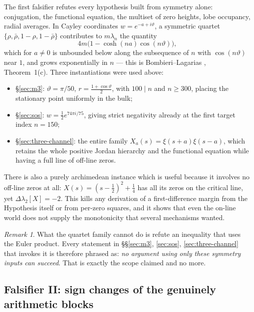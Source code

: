\documentclass[11pt]{amsart}
\theoremstyle{definition}
\theoremstyle{remark}
\newtheorem{remark}[theorem]{Remark}
\theoremstyle{definition}
\newcommand{\half}{\tfrac{1}{2}}
\begin{document}
The first falsifier refutes every hypothesis built from symmetry alone: conjugation, the functional
equation, the multiset of zero heights, lobe occupancy, radial averages. In Cayley coordinates
$w=e^{-a+i\vartheta}$, a symmetric quartet $\{\rho,\bar\rho,1-\rho,1-\bar\rho\}$ contributes to
$m\lambda_n$ the quantity
\begin{equation}\label{eq:quartet-general}
   4m\bigl(1-\cosh(na)\cos(n\vartheta)\bigr),
\end{equation}
which for $a\ne0$ is unbounded below along the subsequence of $n$ with $\cos(n\vartheta)$ near
$1$, and grows exponentially in $n$ --- this is Bombieri--Lagarias
\cite{BombieriLagarias1999}, Theorem~1(c). Three instantiations were used above:
\begin{itemize}[leftmargin=*]
\item \S\ref{sec:m3}: $\vartheta=\pi/50$, $r=\tfrac{1+\cos\vartheta}{2}$, with $100\mid n$ and
      $n\ge300$, placing the stationary point uniformly in the bulk;
\item \S\ref{sec:sos}: $w=\tfrac12e^{74\pi i/75}$, giving strict negativity already at the first
      target index $n=150$;
\item \S\ref{sec:three-channel}: the entire family $X_a(s)=\xi(s+a)\xi(s-a)$, which retains the
      whole positive Jordan hierarchy and the functional equation while having a full line of
      off-line zeros.
\end{itemize}
There is also a purely archimedean instance which is useful because it involves no off-line zeros
at all: $X(s)=(s-\half)^2+\tfrac14$ has all its zeros on the critical line, yet
$\Delta\lambda_2[X]=-2$. This kills any derivation of a first-difference margin from the Hypothesis
itself or from per-zero squares, and it shows that even the on-line world does not supply the
monotonicity that several mechanisms wanted.

\begin{remark}\label{rmk:quartet-scope}
What the quartet family cannot do is refute an inequality that uses the Euler product. Every
statement in \S\S\ref{sec:m3}, \ref{sec:sos}, \ref{sec:three-channel} that invokes it is therefore
phrased as: \emph{no argument using only these symmetry inputs can succeed}. That is exactly the
scope claimed and no more.
\end{remark}

\subsection{Falsifier II: sign changes of the genuinely arithmetic blocks}\label{sec:fals-arith}
\end{document}
